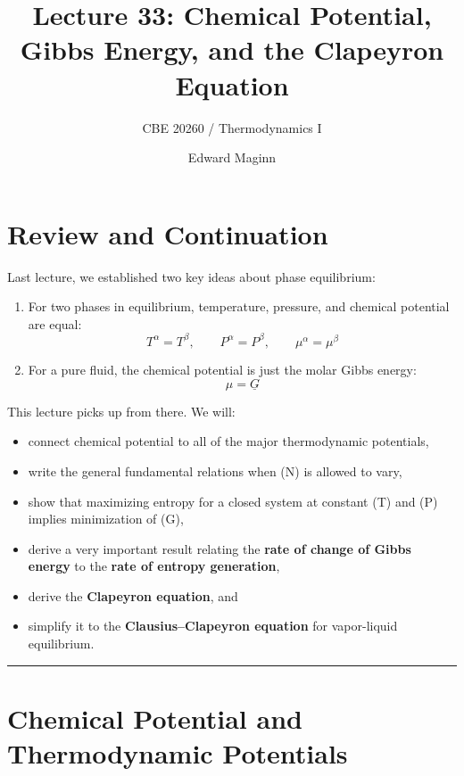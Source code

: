 \documentclass[
  letterpaper,
  DIV=11,
  numbers=noendperiod]{scrartcl}
\title{Lecture 33: Chemical Potential, Gibbs Energy, and the Clapeyron
Equation}
\subtitle{CBE 20260 / Thermodynamics I}
\author{Edward Maginn}
\date{}
\providecommand{\tightlist}{%
  \setlength{\itemsep}{0pt}\setlength{\parskip}{0pt}}
\renewcommand*\contentsname{Table of contents}
\newcommand\contentsname{Table of contents}
\begin{document}
\maketitle

\renewcommand*\contentsname{Table of contents}
{
\setcounter{tocdepth}{3}
\tableofcontents
}

\section{Review and Continuation}\label{review-and-continuation}

Last lecture, we established two key ideas about phase equilibrium:

\begin{enumerate}
\def\labelenumi{\arabic{enumi}.}
\item
  For two phases in equilibrium, temperature, pressure, and chemical
  potential are equal: \[
  T^\alpha = T^\beta,\qquad
  P^\alpha = P^\beta,\qquad
  \mu^\alpha = \mu^\beta
  \]
\item
  For a pure fluid, the chemical potential is just the molar Gibbs
  energy: \[
  \mu = \underline{G}
  \]
\end{enumerate}

This lecture picks up from there. We will:

\begin{itemize}
\tightlist
\item
  connect chemical potential to all of the major thermodynamic
  potentials,
\item
  write the general fundamental relations when (N) is allowed to vary,
\item
  show that maximizing entropy for a closed system at constant (T) and
  (P) implies minimization of (G),
\item
  derive a very important result relating the \textbf{rate of change of
  Gibbs energy} to the \textbf{rate of entropy generation},
\item
  derive the \textbf{Clapeyron equation}, and
\item
  simplify it to the \textbf{Clausius--Clapeyron equation} for
  vapor-liquid equilibrium.
\end{itemize}

\begin{center}\rule{0.5\linewidth}{0.5pt}\end{center}

\section{Chemical Potential and Thermodynamic
Potentials}\label{chemical-potential-and-thermodynamic-potentials}
\end{document}
